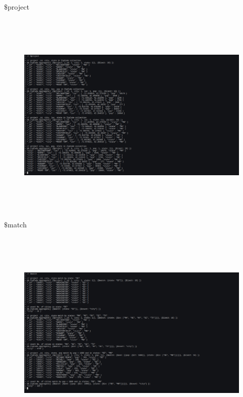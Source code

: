 \documentclass[a4paper,11pt,openright]{report}
\begin{document}
\pagebreak

{\footnotesize $\$$project}
\begin{figure}[ht!]
\includegraphics[width=20cm,height=10cm,keepaspectratio]{image3.pdf}
\centering
\end{figure}

\vspace{20px}

{\footnotesize $\$$match}
\begin{figure}[ht!]
\includegraphics[width=20cm,height=10cm,keepaspectratio]{image4.pdf}
\centering
\end{figure}

\pagebreak
\end{document}
